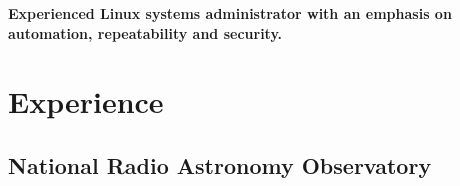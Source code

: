 \documentclass[letterpaper]{deedy-resume-openfont}
\begin{document}
\begin{minipage}[t]{0.69\textwidth} %
\vspace{3pt}
\newcommand{\summary}[1]{ %
\raggedright\bfseries { #1 \\}
\hrulefill
}

\summary{Experienced Linux systems administrator with an emphasis on automation, repeatability and security.} 

\section{Experience}
	
\subsection{National Radio Astronomy Observatory}


\end{minipage}
\end{document}

